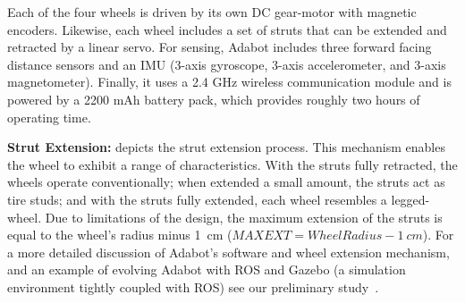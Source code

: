 
Each of the four wheels is driven by its own DC gear-motor with magnetic encoders.
%
Likewise, each wheel includes a set of struts that can be extended and retracted by a linear servo.
%
For sensing, Adabot includes three forward facing distance sensors and an IMU (3-axis gyroscope, 3-axis accelerometer, and 3-axis magnetometer).
%
Finally, it uses a 2.4 GHz wireless communication module and is powered by a 2200 mAh battery pack, which provides roughly two hours of operating time.


\noindent
\textbf{Strut Extension:}
%
 depicts the strut extension process.
%
This mechanism enables the wheel to exhibit a range of characteristics.
%
With the struts fully retracted, the wheels operate conventionally; when extended a small amount, the struts act as tire studs; and with the struts fully extended, each wheel resembles a legged-wheel.
%
%
Due to limitations of the design, the maximum extension of the struts is equal to the wheel's radius minus 1~\si{cm} ($\mathit{MAXEXT} = \mathit{WheelRadius} - 1~\si{cm}$).
%
For a more detailed discussion of Adabot's software and wheel extension mechanism, and an example of evolving Adabot with ROS and Gazebo (a simulation environment tightly coupled with ROS)
see our preliminary study~\citep{Clark.2017.SSCI.Adabot}.



